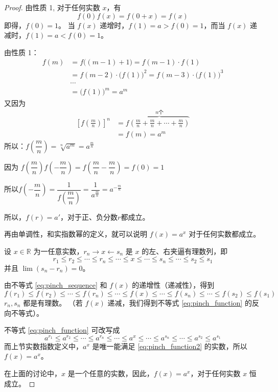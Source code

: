 \begin{proof}
由性质 1, 对于任何实数 $x$，有
\[f(0)f(x)=f(0+x)=f(x)\]
即得，$f(0)=1$。 当 $f(x)$ 递增时，$f(1)=a>f(0)=1$，而当 $f(x)$ 递减时，$f(1)=a<f(0)=1$。

由性质 1：
\[\begin{split}
  f(m)&=f\big((m-1)+1\big)=f(m-1)\cdot f(1)\\
  &=f(m-2)\cdot \big(f(1)\big)^2=f(m-3)\cdot \big(f(1)\big)^3\\
  & \cdots  \\
  & =\big(f(1)\big)^m=a^m
\end{split}\]
又因为
\[\begin{split}
  \left[f\left(\frac{m}{n}\right)\right]^n&=f\overbrace{\left(\frac{m}{n}+\frac{m}{n}+\cdots +\frac{m}{n}\right)}^{n\text{个}}\\
  &=f(m)=a^m
\end{split}\]
所以：$f\left(\dfrac{m}{n}\right)=\sqrt[n]{a^m}=a^{\tfrac{m}{n}}$

因为 $f\left(\dfrac{m}{n}\right)f\left(-\dfrac{m}{n}\right)=f\left(\dfrac{m}{n}-\dfrac{m}{n}\right)=f(0)=1$

所以$f\left(-\dfrac{m}{n}\right)=\dfrac{1}{f\left(\dfrac{m}{n}\right)}=\dfrac{1}{a^{\tfrac{m}{n}}}=a^{-\tfrac{m}{n}}$

所以，$f(r)=a'$，对于正、负分数$r$都成立。

再由单调性，和实指数幂的定义，就可以说明 $f(x)=a^x$ 对于任何实数都成立。

设 $x\in\mathbb{R}$ 为一任意实数，$r_n\to x\leftarrow s_n$ 是 $x$ 的左、右夹逼有理数列，即
\begin{equation}
  \label{eq:pinch_sequence}
  r_1\leqslant r_2\leqslant\cdots \leqslant r_n\leqslant\cdots \leqslant x\leqslant\cdots \leqslant s_n\leqslant\cdots \leqslant s_2\leqslant s_1
\end{equation}
并且 $\lim(s_n-r_n)=0$。

由不等式 \eqref{eq:pinch_sequence} 和 $f(x)$ 的递增性（递减性），得到
\begin{equation}
  \label{eq:pinch_function}
  f(r_1)\leqslant f(r_2)\leqslant\cdots \leqslant f(r_n)\leqslant\cdots \leqslant f(x)\leqslant\cdots \leqslant f(s_n)\leqslant\cdots \leqslant f(s_2)\leqslant f(s_1)
\end{equation}
$r_n,s_n$ 都是有理数。
（若 $f(x)$ 递减，我们得到不等式 \eqref{eq:pinch_function} 的反向不等式）。

不等式 \eqref{eq:pinch_function} 可改写成
\begin{equation}
  \label{eq:pinch_function2}
  a^{r_1}\leqslant a^{r_2}\leqslant\cdots \leqslant a^{r_n}\leqslant\cdots \leqslant a^{x}\leqslant\cdots \leqslant a^{s_n}\leqslant\cdots \leqslant a^{s_2}\leqslant a^{s_1}
\end{equation}
而上节实数指数定义中，$a^x$ 是唯一能满足 \eqref{eq:pinch_function2} 的实数，所以 $f(x)=a^x$。

在上面的讨论中，$x$ 是一个任意的实数，因此，$f(x)=a^x$，对于任何实数 $x$ 恒成立。
\end{proof}

